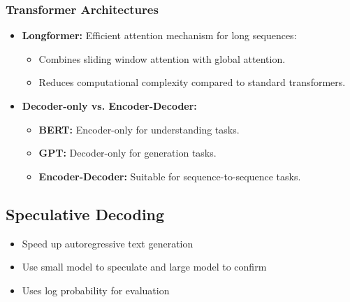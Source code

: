\documentclass[12pt,a4paper]{article}
\begin{document}
\subsubsection{Transformer Architectures}
\begin{itemize}
    \item \textbf{Longformer:} Efficient attention mechanism for long sequences:
    \begin{itemize}
        \item Combines sliding window attention with global attention.
        \item Reduces computational complexity compared to standard transformers.
    \end{itemize}
    \item \textbf{Decoder-only vs. Encoder-Decoder:}
    \begin{itemize}
        \item \textbf{BERT:} Encoder-only for understanding tasks.
        \item \textbf{GPT:} Decoder-only for generation tasks.
        \item \textbf{Encoder-Decoder:} Suitable for sequence-to-sequence tasks.
    \end{itemize}
\end{itemize}
\subsection{Speculative Decoding} %
\begin{itemize}
    \item Speed up autoregressive  text generation 
    \item Use small model to speculate and large model to confirm 
    \item Uses log probability for evaluation 
    
\end{itemize}
\end{document}
